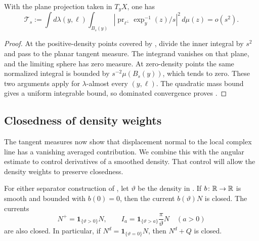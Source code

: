 \begin{corollary}
\label{cor:density-transverse}
With the plane projection taken in \(T_yX\), one has
\begin{equation}\label{eq:density-transverse}
 \mathcal T_s:=
 \int d\lambda(y,\ell)
 \int_{B_s(y)}
 \left|\operatorname{pr}_{\ell^\perp}
                \exp_y^{-1}(z)/s\right|^2\,d\mu(z)
 =o(s^2).
\end{equation}
\end{corollary}

\begin{proof}
At the positive-density points covered by
, divide the inner integral by
\(s^2\) and pass to the planar tangent measure.  The integrand vanishes
on that plane, and the limiting sphere has zero measure.
At zero-density points the same normalized integral is bounded by
\(s^{-2}\mu(B_s(y))\), which tends to zero.  These two arguments apply
for \(\lambda\)-almost every \((y,\ell)\).  The quadratic mass bound
gives a uniform integrable bound, so dominated convergence proves
.
\end{proof}

\subsection{Closedness of density weights}

The tangent measures now show that displacement normal to the local
complex line has a vanishing averaged contribution. We combine this
with the angular estimate to control derivatives of a smoothed density.
That control will allow the density weights to preserve closedness.

\begin{proposition}\label{prop:density-weights}
For either separator construction of ,
let \(\vartheta\) be the density in .
If \(b\colon\mathbb R\to\mathbb R\) is smooth and bounded with \(b(0)=0\), then
the current \(b(\vartheta)N\) is closed.
The currents
\begin{equation}\label{eq:density-weighted-restrictions}
 N^+=\mathbf1_{\{\vartheta>0\}}N,
 \qquad
 I_a=\mathbf1_{\{\vartheta>a\}}\frac{\pi}{\vartheta}N
 \quad(a>0)
\end{equation}
are also closed.  In particular, if
\(N^d=\mathbf1_{\{\vartheta=0\}}N\), then \(N^d+Q\) is closed.
\end{proposition}

